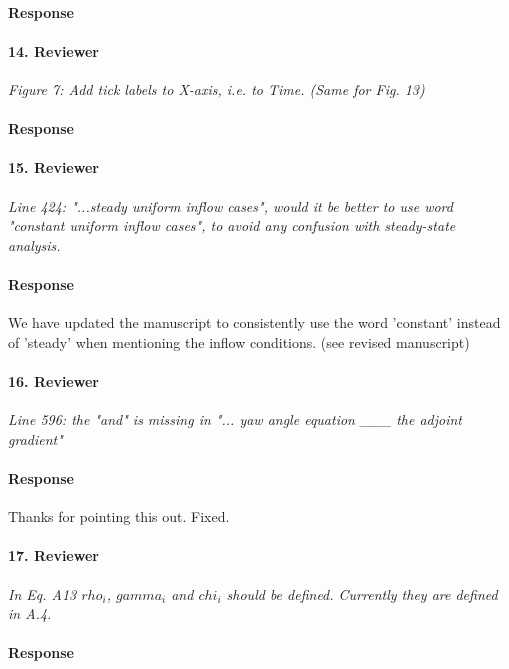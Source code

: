 \documentclass[]{article}
\begin{document}
\paragraph{Response} 

\hrulefill

\paragraph{14. Reviewer} \textit{Figure 7: Add tick labels to X-axis, i.e. to Time. (Same for Fig. 13)}

\paragraph{Response} 

\hrulefill

\paragraph{15. Reviewer} \textit{Line 424: "...steady uniform inflow cases", would it be better to use word "constant uniform inflow cases", to avoid any confusion with steady-state analysis.}

\paragraph{Response} We have updated the manuscript to consistently use the word 'constant' instead of 'steady' when mentioning the inflow conditions. (see revised manuscript)

\hrulefill

\paragraph{16. Reviewer} \textit{Line 596: the "and" is missing in "... yaw angle equation \_\_\_ the adjoint gradient"}

\paragraph{Response} Thanks for pointing this out. Fixed.

\hrulefill

\paragraph{17. Reviewer} \textit{In Eq. A13 $rho_i$, $gamma_i$ and $chi_i$ should be defined. Currently they are defined in A.4.}

\paragraph{Response} 

\hrulefill
\end{document}
